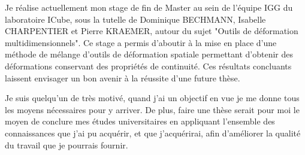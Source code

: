 \documentclass[11pt,a4paper,sans]{moderncv}        %
\begin{document}
Je réalise actuellement mon stage de fin de Master au sein de l'équipe IGG du laboratoire ICube, sous la tutelle de Dominique BECHMANN, Isabelle CHARPENTIER et Pierre KRAEMER, autour du sujet "Outils de déformation multidimensionnels". Ce stage a permis d'aboutir à la mise en place d'une méthode de mélange d'outils de déformation spatiale permettant d'obtenir des déformations conservant des propriétés de continuité. Ces résultats concluants laissent envisager un bon avenir à la réussite d'une future thèse.

Je suis quelqu'un de très motivé, quand j'ai un objectif en vue je me donne tous les moyens nécessaires pour y arriver. De plus, faire une thèse serait pour moi le moyen de conclure mes études universitaires en appliquant l'ensemble des connaissances que j'ai pu acquérir, et que j'acquérirai, afin d'améliorer la qualité du travail que je pourrais fournir.

\makeletterclosing

\end{document}
